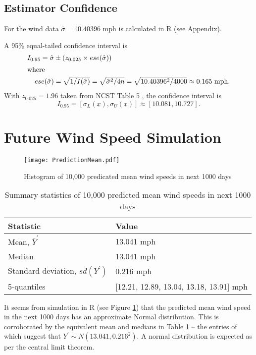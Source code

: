 \documentclass[11pt]{article}
\begin{document}
\subsection{Estimator Confidence}

For the wind data $ \hat\sigma = 10.40396 \text{ mph}$ is calculated in R (see Appendix).

A 95\% equal-tailed confidence interval is
\begin{align*}
    I_{0.95} = \hat\sigma &\pm \left(z_{0.025} \times ese(\hat\sigma)\right) \\
\intertext{where}
    ese(\hat\sigma) &= \sqrt{1/I(\hat\sigma)} = \sqrt{\hat\sigma^2/4n} = \sqrt{10.40396^2 / 4000} \approx 0.165 \text{ mph.}
\end{align*}
With $z_{0.025} = 1.96$ taken from NCST Table 5 \cite{NCST}, the confidence interval is
$$ I_{0.95} = [\sigma_L(\underline{x}), \sigma_U(\underline{x})] \approx [ 10.081 , 10.727 ] \text{.}$$

\section{Future Wind Speed Simulation}

\begin{figure}[ht]
    \centering
	\texttt{[image: PredictionMean.pdf]}
    \caption{Histogram of 10,000 predicated mean wind speeds in next 1000 days}
    \label{fig:mean_hist}
\end{figure}

\begin{table}[ht]
    \centering
    \begin{tabular}{ll}
    Statistic & Value \\ \hline
    Mean, $\bar Y^\prime$ \rule{0pt}{3ex} & 13.041 mph \\
    Median & 13.041 mph \\
    Standard deviation, $sd(Y^\prime)$ & 0.216 mph \\
    5-quantiles & [12.21, 12.89, 13.04, 13.18, 13.91] mph
    \end{tabular}
    \caption{Summary statistics of 10,000 predicted mean wind speeds in next 1000 days}
    \label{t:mean}
\end{table}

It seems from simulation in R (see Figure \ref{fig:mean_hist}) that the predicted mean
wind speed in the next 1000 days has an approximate Normal distribution.
This is corroborated by the equivalent mean and medians in Table
\ref{t:mean} -- the entries of which suggest that
$Y^\prime \sim N(13.041, 0.216^2)$. A normal distribution is expected as
per the central limit theorem.
\end{document}
